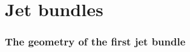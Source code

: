 \section{Jet bundles}

\begin{frame}
    \frametitle{The geometry of the first jet bundle}
    
\end{frame}